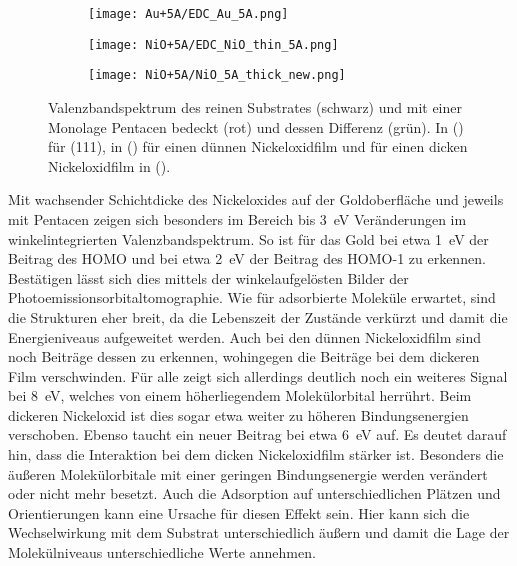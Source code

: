         \begin{figure}
            \centering
            \begin{subfigure}[t]{0.30\textwidth}
                \centering
                \texttt{[image: Au+5A/EDC\_Au\_5A.png]}
                \subcaption{}
                \label{fig:EDC_Au+5A}
            \end{subfigure}
            \begin{subfigure}[t]{0.30\textwidth}
                \centering
                \texttt{[image: NiO+5A/EDC\_NiO\_thin\_5A.png]}
                \subcaption{}
                \label{fig:EDC_NiO_thin+5A}
            \end{subfigure}
            \begin{subfigure}[t]{0.30\textwidth}
                \centering
                \texttt{[image: NiO+5A/NiO\_5A\_thick\_new.png]}
                \subcaption{}
                \label{fig:EDC_NiO+5A}
            \end{subfigure}
            \caption{Valenzbandspektrum des reinen Substrates (schwarz) und mit einer Monolage Pentacen bedeckt (rot) und dessen Differenz (grün).
            In () für (111), in () für einen dünnen Nickeloxidfilm und für einen dicken Nickeloxidfilm in ().}
        \end{figure}
        Mit wachsender Schichtdicke des Nickeloxides auf der Goldoberfläche und jeweils mit Pentacen zeigen sich besonders im Bereich bis \SI{3}{\electronvolt} Veränderungen im winkelintegrierten Valenzbandspektrum.
        So ist für das Gold bei etwa \SI{1}{\electronvolt} der Beitrag des HOMO und bei etwa \SI{2}{\electronvolt} der Beitrag des HOMO-1 zu erkennen.
        Bestätigen lässt sich dies mittels der winkelaufgelösten Bilder der Photoemissionsorbitaltomographie.
        Wie für adsorbierte Moleküle erwartet, sind die Strukturen eher breit, da die Lebenszeit der Zustände verkürzt und damit die Energieniveaus aufgeweitet werden.
        Auch bei den dünnen Nickeloxidfilm sind noch Beiträge dessen zu erkennen, wohingegen die Beiträge bei dem dickeren Film verschwinden.
        Für alle zeigt sich allerdings deutlich noch ein weiteres Signal bei \SI{8}{\electronvolt}, welches von einem höherliegendem Molekülorbital herrührt.
        Beim dickeren Nickeloxid ist dies sogar etwa weiter zu höheren Bindungsenergien verschoben.
        Ebenso taucht ein neuer Beitrag bei etwa \SI{6}{\electronvolt} auf.
        Es deutet darauf hin, dass die Interaktion bei dem dicken Nickeloxidfilm stärker ist.
        Besonders die äußeren Molekülorbitale mit einer geringen Bindungsenergie werden verändert oder nicht mehr besetzt.
        Auch die Adsorption auf unterschiedlichen Plätzen und Orientierungen kann eine Ursache für diesen Effekt sein.
        Hier kann sich die Wechselwirkung mit dem Substrat unterschiedlich äußern und damit die Lage der Molekülniveaus unterschiedliche Werte annehmen.

